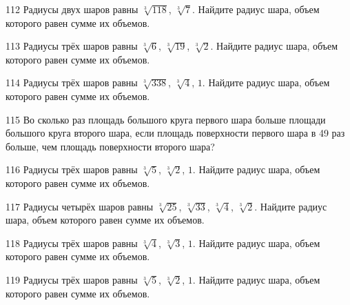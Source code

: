 \documentclass[a4paper]{article}
\begin{document}
\begin{taskBN}{112}
Радиусы двух шаров равны $\sqrt[3]{118}$, $\sqrt[3]{7}$. Найдите радиус шара, объем которого равен сумме их объемов.
\end{taskBN}

\begin{taskBN}{113}
Радиусы трёх шаров равны $\sqrt[3]{6}$, $\sqrt[3]{19}$, $\sqrt[3]{2}$. Найдите радиус шара, объем которого равен сумме их объемов.
\end{taskBN}

\begin{taskBN}{114}
Радиусы трёх шаров равны $\sqrt[3]{338}$, $\sqrt[3]{4}$, $1$. Найдите радиус шара, объем которого равен сумме их объемов.
\end{taskBN}

\begin{taskBN}{115}
Во сколько раз площадь большого круга первого шара больше площади большого круга второго шара, если площадь поверхности первого шара в 49 раз больше, чем площадь поверхности второго шара?
\end{taskBN}

\begin{taskBN}{116}
Радиусы трёх шаров равны $\sqrt[3]{5}$, $\sqrt[3]{2}$, $1$. Найдите радиус шара, объем которого равен сумме их объемов.
\end{taskBN}

\begin{taskBN}{117}
Радиусы четырёх шаров равны $\sqrt[3]{25}$, $\sqrt[3]{33}$, $\sqrt[3]{4}$, $\sqrt[3]{2}$. Найдите радиус шара, объем которого равен сумме их объемов.
\end{taskBN}

\begin{taskBN}{118}
Радиусы трёх шаров равны $\sqrt[3]{4}$, $\sqrt[3]{3}$, $1$. Найдите радиус шара, объем которого равен сумме их объемов.
\end{taskBN}

\begin{taskBN}{119}
Радиусы трёх шаров равны $\sqrt[3]{5}$, $\sqrt[3]{2}$, $1$. Найдите радиус шара, объем которого равен сумме их объемов.
\end{taskBN}
\end{document}
